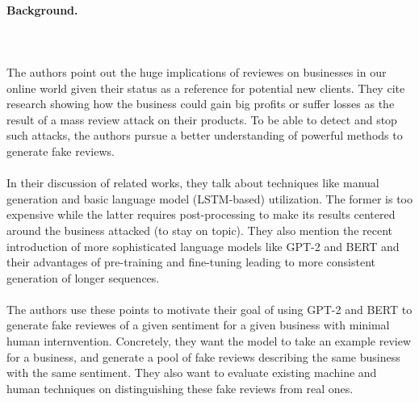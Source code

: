 \documentclass{article}
\begin{document}
\paragraph{Background.}$ $
\\\\ The authors point out the huge implications of reviewes on businesses in our online world given their status as a reference for potential new clients. They cite research showing how the business could gain big profits or suffer losses as the result of a mass review attack on their products.  To be able to detect and stop such attacks,  the authors pursue a better understanding of powerful methods to generate fake reviews.
\\\\ In their discussion of related works,  they talk about techniques like manual generation and basic language model (LSTM-based) utilization.  The former is too expensive while the latter requires post-processing to make its results centered around the business attacked (to stay on topic).  They also mention the recent introduction of more sophisticated language models like GPT-2 and BERT and their advantages of pre-training and fine-tuning leading to more consistent generation of longer sequences.  
\\\\ The authors use these points to motivate their goal of using GPT-2 and BERT to generate fake reviewes of a given  sentiment for a given business with minimal human internvention.  Concretely,  they want the model to take an example review for a business, and generate a pool of fake reviews describing the same business with the same sentiment.  They also want to evaluate existing machine and human techniques on distinguishing these fake reviews from real ones.
\end{document}
